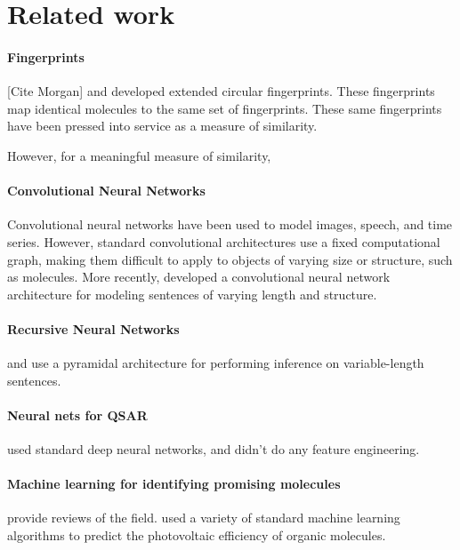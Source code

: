 \documentclass{article} %
\begin{document}
\section{Related work}

\paragraph{Fingerprints}

[Cite Morgan] and \cite{ECFP2010} developed extended circular fingerprints.
These fingerprints map identical molecules to the same set of fingerprints.
These same fingerprints have been pressed into service as a measure of similarity.

However, for a meaningful measure of similarity, 

\paragraph{Convolutional Neural Networks}

Convolutional neural networks have been used to model images, speech, and time series\cite{lecun1995convolutional}.
However, standard convolutional architectures use a fixed computational graph, making them difficult to apply to objects of varying size or structure, such as molecules.
More recently, \cite{KalchbrennerACL2014} developed a convolutional neural network architecture for modeling sentences of varying length and structure.

\paragraph{Recursive Neural Networks}

\cite{socher2011semi} and \cite{socher2011dynamic} use a pyramidal architecture for performing inference on variable-length sentences.

\paragraph{Neural nets for QSAR}

\cite{dahl2014multi} used standard deep neural networks, and didn't do any feature engineering.

\paragraph{Machine learning for identifying promising molecules}

\cite{Eckert2007225, bergeron2011modeling} provide reviews of the field.
\cite{tingley2014towards} used a variety of standard machine learning algorithms to predict the photovoltaic efficiency of organic molecules.
\end{document}
